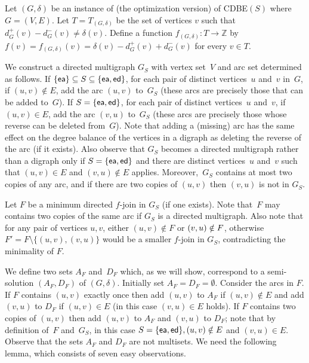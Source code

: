\documentclass[11pt]{llncs}
\newcommand{\ed}{{\sf ed}}
\newcommand{\ea}{{\sf ea}}
\newcommand{\cdbe}{{\sc CDBE}}
\begin{document}
Let $(G,\delta)$ be an instance of (the optimization version) of \cdbe$(S)$
where $G=(V,E)$.  Let $T=T_{(G,\delta)}$ be the set of vertices $v$ such that
$d^+_G(v)-d^-_G(v)\neq \delta(v)$.  Define a function $f_{(G,\delta)}:T\to
\mathbb{Z}$ by $f(v)=f_{(G,\delta)}(v)=\delta(v)-d^+_G(v)+d^-_G(v)$ for every
$v\in T$. 

We construct a directed multigraph $G_S$ with vertex set~$V$ 
and arc set
determined as follows.
If $\{\ea\}\subseteq S \subseteq \{\ea,\ed\}$, for each pair of distinct
vertices~$u$ and~$v$ in~$G$, if $(u,v) \notin E$, add the arc $(u,v)$ to~$G_S$
(these arcs are precisely those that can be added to~$G$). If $S=\{\ea,\ed\}$,
for each pair of distinct vertices~$u$ and~$v$, if $(u,v) \in E$, add the
arc $(v,u)$ to~$G_S$ (these arcs are precisely those whose reverse can be
deleted from~$G$). Note that adding a
(missing)
arc has the same effect on the degree
balance of the vertices in a digraph as deleting the reverse of the arc 
(if it exists).
Also 
observe that $G_S$ becomes a directed multigraph rather than a digraph only if
$S=\{\ea,\ed\}$ and there are distinct vertices~$u$ and~$v$ such that $(u,v)
\in E$ and $(v,u) \notin E$ applies.  Moreover,~$G_S$ contains at most two
copies of any arc, and if there are two copies of $(u,v)$ then $(v,u)$ is not
in $G_S$.

Let $F$ be a minimum directed
$f$-join in $G_S$ (if one exists).  Note that~$F$ may contains two copies of
the same arc if $G_S$ is a directed multigraph.  
Also note that for any pair of vertices
$u,v$, either $(u,v)\notin F$ or $(v,u)\notin\nobreak F$, otherwise $F'=F \setminus
\{(u,v),(v,u)\}$ would be a smaller $f$-join in $G_S$, contradicting the
minimality of $F$. 

We define two sets $A_F$ and~$D_F$ which, as we will show, correspond to a
semi-solution $(A_F,D_F)$ of $(G,\delta)$.  Initially set $A_F=D_F=\emptyset$.
Consider the arcs in $F$.   
If $F$ contains $(u,v)$ exactly once then add $(u,v)$ to  
$A_F$ if $(u,v)\notin E$ and add $(v,u)$ to $D_F$ if $(u,v)\in E$ (in this case $(v,u)\in E$ holds).
If $F$ contains two copies of $(u,v)$ then add $(u,v)$ to $A_F$ and $(v,u)$ to $D_F$;
note that by definition of~$F$ and~$G_S$, in this case $S=\{\ea,\ed\}, (u,v) \notin
E$ and $(v,u) \in E$.
Observe that the sets $A_F$ and $D_F$ are not multisets.
We need the following lemma, which consists of seven 
easy observations.
\end{document}
